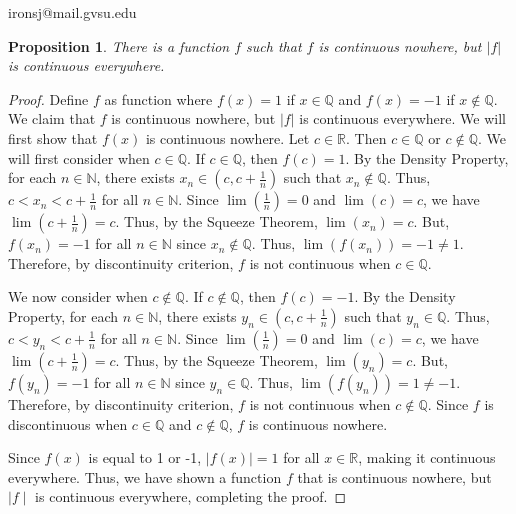 \documentclass[11 pt]{article}
\newtheorem{proposition}{Proposition}
\newcommand{\newpar}{\vspace{.15in}\noindent}
\begin{document}
\noindent ironsj@mail.gvsu.edu
\newpar
\begin{proposition}
There is a function $f$ such that $f$ is continuous nowhere, but $\lvert f\rvert$ is continuous everywhere.

\end{proposition}
\begin{proof}
Define $f$ as function where $f(x)=1$ if $x\in\mathbb{Q}$ and $f(x)=-1$ if $x\not\in\mathbb{Q}$. We claim that $f$ is continuous nowhere, but $\lvert f\rvert$ is continuous everywhere. We will first show that $f(x)$ is continuous nowhere. Let $c\in\mathbb{R}$. Then $c\in\mathbb{Q}$ or $c\not\in\mathbb{Q}$. We will first consider when $c\in\mathbb{Q}$. If $c\in\mathbb{Q}$, then $f(c)=1$. By the Density Property, for each $n\in\mathbb{N}$, there exists $x_n\in(c,c+\frac{1}{n})$ such that $x_n\not\in\mathbb{Q}$. Thus, $c<x_n<c+\frac{1}{n}$ for all $n\in\mathbb{N}$. Since $\lim(\frac{1}{n})=0$ and $\lim(c)=c$, we have $\lim(c+\frac{1}{n})=c$. Thus, by the Squeeze Theorem, $\lim(x_n)=c$. But, $f(x_n)=-1$ for all $n\in\mathbb{N}$ since $x_n\not\in\mathbb{Q}$. Thus, $\lim(f(x_n))=-1\neq1$. Therefore, by discontinuity criterion, $f$ is not continuous when $c\in\mathbb{Q}$.

\newpar
We now consider when $c\not\in\mathbb{Q}$. If $c\not\in\mathbb{Q}$, then $f(c)=-1$. By the Density Property, for each $n\in\mathbb{N}$, there exists $y_n\in(c,c+\frac{1}{n})$ such that $y_n\in\mathbb{Q}$. Thus, $c<y_n<c+\frac{1}{n}$ for all $n\in\mathbb{N}$. Since $\lim(\frac{1}{n})=0$ and $\lim(c)=c$, we have $\lim(c+\frac{1}{n})=c$. Thus, by the Squeeze Theorem, $\lim(y_n)=c$. But, $f(y_n)=-1$ for all $n\in\mathbb{N}$ since $y_n\in\mathbb{Q}$. Thus, $\lim(f(y_n))=1\neq-1$. Therefore, by discontinuity criterion, $f$ is not continuous when $c\not\in\mathbb{Q}$. Since $f$ is discontinuous when $c\in\mathbb{Q}$ and $c\not\in\mathbb{Q}$, $f$ is continuous nowhere.

\newpar
Since $f(x)$ is equal to 1 or -1, $\lvert f(x) \rvert=1$ for all $x\in\mathbb{R}$, making it continuous everywhere. Thus, we have shown a function $f$ that is continuous nowhere, but $\mid f\mid$ is continuous everywhere, completing the proof.



\end{proof}
\end{document}
